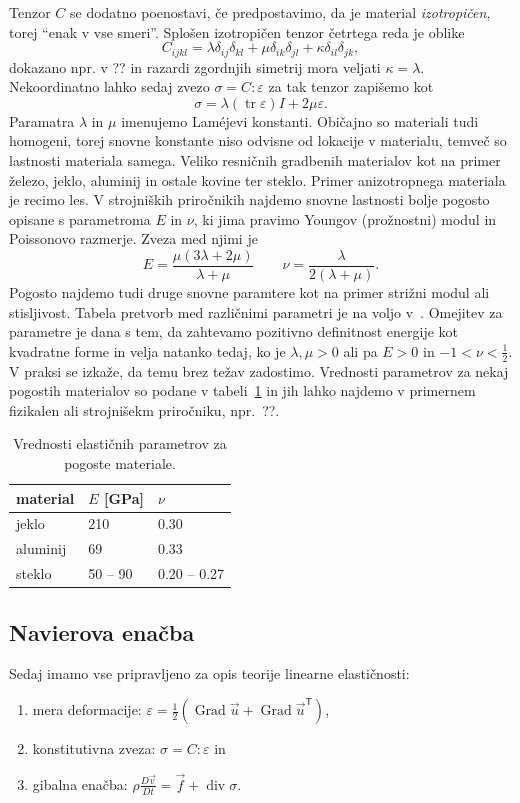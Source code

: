 \documentclass[12pt,a4paper]{article}
\theoremstyle{definition} %
\theoremstyle{plain} %
\numberwithin{equation}{section}
\newcommand{\T}{\mathsf{T}}
\renewcommand{\div}{\operatorname{div}}
\newcommand{\Grad}{\operatorname{Grad}}
\newcommand{\eps}{\varepsilon}
\newcommand{\DD}[2]{\ensuremath{\frac{D #1}{D #2}}}
\newcommand{\DDt}[1]{\DD{#1}{t}}
\newcommand{\vv}{\vec{v}}
\newcommand{\vu}{\vec{u}}
\newcommand{\vf}{\vec{f}}
\newcommand{\ts}{\sigma}
\DeclareMathOperator{\tr}{tr}
\begin{document}
Tenzor $C$ se dodatno poenostavi, če predpostavimo, da je material
\emph{izotropičen}, torej ``enak v vse smeri''. Splošen izotropičen tenzor
četrtega reda je oblike
\[
  C_{ijkl} = \lambda \delta_{ij}\delta_{kl} + \mu \delta_{ik}\delta_{jl} +
  \kappa \delta_{il}\delta_{jk},
\]
dokazano npr. v ?? in razardi zgordnjih simetrij mora veljati $\kappa =
\lambda$.
Nekoordinatno lahko sedaj zvezo $\ts = C:\eps$ za tak tenzor zapišemo kot
\begin{equation}
  \ts = \lambda (\tr\eps)I + 2\mu \eps.
  \label{eq:hooke-isotropic}
\end{equation}
Paramatra $\lambda$ in $\mu$ imenujemo Lam\'{e}jevi konstanti.
Običajno so materiali tudi homogeni, torej snovne konstante niso odvisne od
lokacije v materialu, temveč so lastnosti materiala samega.
Veliko resničnih gradbenih materialov kot na primer železo, jeklo, aluminij in
ostale kovine ter steklo. Primer anizotropnega materiala je recimo les.
V strojniških priročnikih najdemo snovne lastnosti bolje pogosto opisane s
parametroma $E$ in $\nu$, ki jima pravimo Youngov (prožnostni) modul in
Poissonovo razmerje. Zveza med njimi je
\[
  E = \frac{\mu(3\lambda+2\mu)}{\lambda+\mu} \qquad \nu =
  \frac{\lambda}{2(\lambda+\mu)}.
\]
Pogosto najdemo tudi druge snovne paramtere kot na primer strižni modul ali
stisljivost. Tabela pretvorb med različnimi parametri je na voljo v~\cite[tabela
5.1, str.\ 215]{slaughter2012linearized}. Omejitev za parametre je dana s tem,
da zahtevamo pozitivno definitnost energije kot kvadratne forme in velja natanko
tedaj, ko je $\lambda, \mu > 0$ ali pa $E > 0$ in $-1 < \nu < \frac12$.
V praksi se izkaže, da temu brez težav zadostimo. Vrednosti parametrov za nekaj
pogostih materialov so podane v tabeli~\ref{tab:Enu} in jih lahko najdemo v
primernem fizikalen ali strojnišekm priročniku, npr.~??.
\begin{table}[h]
  \centering
  \begin{tabular}{|l|l|l|} \hline
    material & $E$ [\unit{GPa}] & $\nu$ \\ \hline
    jeklo    & 210 & 0.30 \\
    aluminij & 69 & 0.33 \\
    steklo   & 50 -- 90 & 0.20 -- 0.27 \\ \hline
  \end{tabular}
  \caption{Vrednosti elastičnih parametrov za pogoste materiale.}
  \label{tab:Enu}
\end{table}

\subsection{Navierova enačba}
Sedaj imamo vse pripravljeno za opis teorije linearne elastičnosti:
\begin{enumerate}[\indent 1)]
  \item mera deformacije: $\eps = \frac12(\Grad \vu + \Grad \vu^\T)$,
  \item konstitutivna zveza: $\ts = C : \eps$ in
  \item gibalna enačba: $\rho \DDt{\vv} = \vf + \div \ts$.
\end{enumerate}
\end{document}

